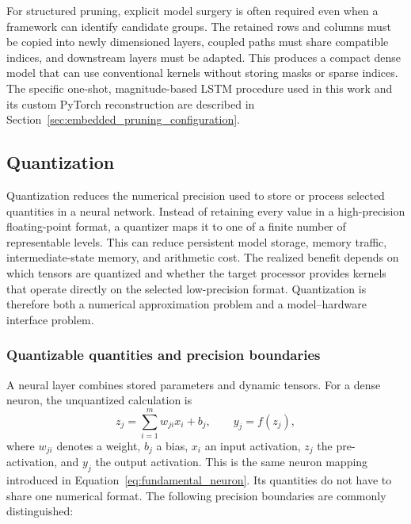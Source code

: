 \documentclass[
    a4paper,
    12pt,
    titlepage,
    bibliography=totoc,
    twoside=on,
    parskip=false,
    numbers=noenddot,
    cleardoublepage=empty,
    DIV=12,
    BCOR=12.0mm,
    headheight=36pt,
    headings=openright
]{scrreprt}
\begin{document}
For structured pruning, explicit model surgery is often required even when a framework can identify candidate groups. The retained rows and columns must be copied into newly dimensioned layers, coupled paths must share compatible indices, and downstream layers must be adapted. This produces a compact dense model that can use conventional kernels without storing masks or sparse indices. The specific one-shot, magnitude-based LSTM procedure used in this work and its custom PyTorch reconstruction are described in Section~\ref{sec:embedded_pruning_configuration}.

\FloatBarrier
\subsection{Quantization}
\label{sec:fundamental_quantization}

Quantization reduces the numerical precision used to store or process selected quantities in a neural network. Instead of retaining every value in a high-precision floating-point format, a quantizer maps it to one of a finite number of representable levels. This can reduce persistent model storage, memory traffic, intermediate-state memory, and arithmetic cost. The realized benefit depends on which tensors are quantized and whether the target processor provides kernels that operate directly on the selected low-precision format. Quantization is therefore both a numerical approximation problem and a model--hardware interface problem.\autocite{nagelWhitePaperNeural2021,gholamiSurveyQuantizationMethods2021}

\subsubsection{Quantizable quantities and precision boundaries}

A neural layer combines stored parameters and dynamic tensors. For a dense neuron, the unquantized calculation is
\begin{equation}
    z_j=\sum_{i=1}^{m}w_{ji}x_i+b_j,
    \qquad
    y_j=f(z_j),
    \label{eq:fundamental_neuron_quantities}
\end{equation}
where $w_{ji}$ denotes a weight, $b_j$ a bias, $x_i$ an input activation, $z_j$ the pre-activation, and $y_j$ the output activation. This is the same neuron mapping introduced in Equation~\eqref{eq:fundamental_neuron}. Its quantities do not have to share one numerical format. The following precision boundaries are commonly distinguished:
\end{document}
